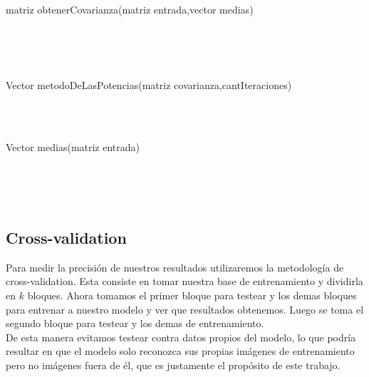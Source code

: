 \begin{algorithm}
\begin{algorithmic}[1]\parskip=1mm
\caption{matriz obtenerCovarianza(matriz entrada,vector medias)}
\\
\\
	\\
	\ENDFOR
\ENDFOR
{}
	\ENDFOR
\ENDFOR
{}
\end{algorithmic}
\end{algorithm}


\begin{algorithm}
\begin{algorithmic}[1]\parskip=1mm
\caption{Vector metodoDeLasPotencias(matriz covarianza,cantIteraciones)}
\\
\ENDFOR\\
\end{algorithmic}
\end{algorithm}

\begin{algorithm}
\begin{algorithmic}[1]\parskip=1mm
\caption{Vector medias(matriz entrada)}
\\
	\\
	\\
	\ENDFOR
\ENDFOR
{}
\end{algorithmic}
\end{algorithm}

\subsection{Cross-validation}
Para medir la precisión de nuestros resultados utilizaremos la metodología de cross-validation. Esta consiste en tomar nuestra base de entrenamiento y dividirla en $k$ bloques. Ahora tomamos el primer bloque para testear y los demas bloques para entrenar a nuestro modelo y ver que resultados obtenemos. Luego se toma el segundo bloque para testear y los demas de entrenamiento.
\\
De esta manera evitamos testear contra datos propios del modelo, lo que podría resultar en que el modelo solo reconozca sus propias imágenes de entrenamiento pero no imágenes fuera de él, que es justamente el propósito de este trabajo.

